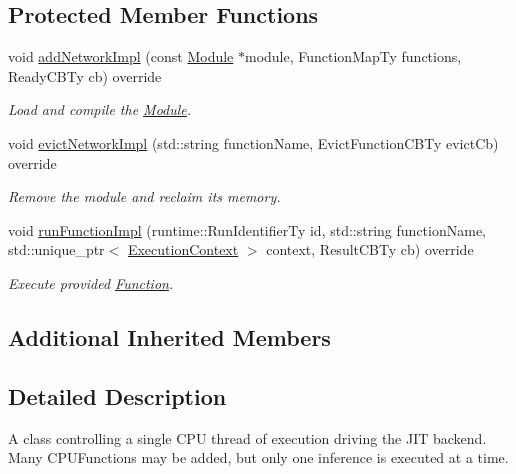 \subsection*{Protected Member Functions}
\begin{DoxyCompactItemize}
\item 
void \hyperlink{classglow_1_1runtime_1_1_c_p_u_device_manager_a00e9a9c52e5f56bb5844af7b2e0e682e}{add\+Network\+Impl} (const \hyperlink{classglow_1_1_module}{Module} $\ast$module, Function\+Map\+Ty functions, Ready\+C\+B\+Ty cb) override
\begin{DoxyCompactList}\small\item\em Load and compile the \hyperlink{classglow_1_1_module}{Module}. \end{DoxyCompactList}\item 
\mbox{\label{classglow_1_1runtime_1_1_c_p_u_device_manager_aac271c3761e5a3f928ccf67472fa7f76}} 
void \hyperlink{classglow_1_1runtime_1_1_c_p_u_device_manager_aac271c3761e5a3f928ccf67472fa7f76}{evict\+Network\+Impl} (std\+::string function\+Name, Evict\+Function\+C\+B\+Ty evict\+Cb) override
\begin{DoxyCompactList}\small\item\em Remove the module and reclaim its memory. \end{DoxyCompactList}\item 
\mbox{\label{classglow_1_1runtime_1_1_c_p_u_device_manager_a3302ba4afe7ee4b0fc7cb70ee32b3bd1}} 
void \hyperlink{classglow_1_1runtime_1_1_c_p_u_device_manager_a3302ba4afe7ee4b0fc7cb70ee32b3bd1}{run\+Function\+Impl} (runtime\+::\+Run\+Identifier\+Ty id, std\+::string function\+Name, std\+::unique\+\_\+ptr$<$ \hyperlink{classglow_1_1_execution_context}{Execution\+Context} $>$ context, Result\+C\+B\+Ty cb) override
\begin{DoxyCompactList}\small\item\em Execute provided \hyperlink{classglow_1_1_function}{Function}. \end{DoxyCompactList}\end{DoxyCompactItemize}
\subsection*{Additional Inherited Members}


\subsection{Detailed Description}
A class controlling a single C\+PU thread of execution driving the J\+IT backend. Many C\+P\+U\+Functions may be added, but only one inference is executed at a time. 

